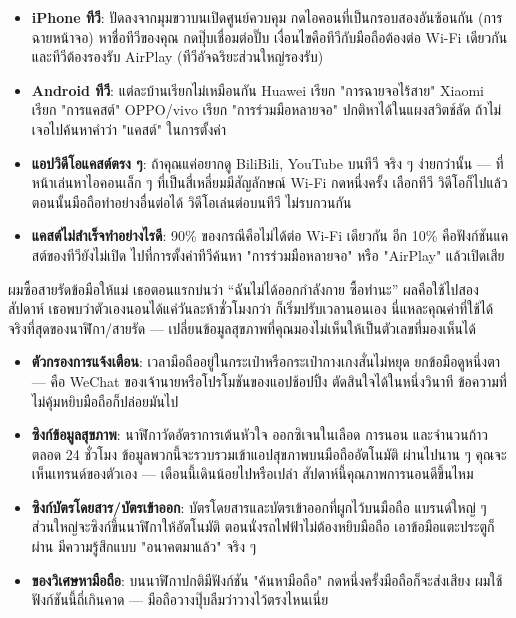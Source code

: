 \begin{itemize}
  \item \textbf{iPhone ทีวี}: ปัดลงจากมุมขวาบนเปิดศูนย์ควบคุม กดไอคอนที่เป็นกรอบสองอันซ้อนกัน (การฉายหน้าจอ) หาชื่อทีวีของคุณ กดปุ๊บเชื่อมต่อปั๊บ เงื่อนไขคือทีวีกับมือถือต้องต่อ Wi-Fi เดียวกัน และทีวีต้องรองรับ AirPlay (ทีวีอัจฉริยะส่วนใหญ่รองรับ)
  \item \textbf{Android ทีวี}: แต่ละบ้านเรียกไม่เหมือนกัน Huawei เรียก "การฉายจอไร้สาย" Xiaomi เรียก "การแคสต์" OPPO/vivo เรียก "การร่วมมือหลายจอ" ปกติหาได้ในแผงสวิตช์ลัด ถ้าไม่เจอไปค้นหาคำว่า "แคสต์" ในการตั้งค่า
  \item \textbf{แอปวิดีโอแคสต์ตรง ๆ}: ถ้าคุณแค่อยากดู BiliBili, YouTube บนทีวี จริง ๆ ง่ายกว่านั้น — ที่หน้าเล่นหาไอคอนเล็ก ๆ ที่เป็นสี่เหลี่ยมมีสัญลักษณ์ Wi-Fi กดหนึ่งครั้ง เลือกทีวี วิดีโอก็ไปแล้ว ตอนนั้นมือถือทำอย่างอื่นต่อได้ วิดีโอเล่นต่อบนทีวี ไม่รบกวนกัน
  \item \textbf{แคสต์ไม่สำเร็จทำอย่างไรดี}: 90\% ของกรณีคือไม่ได้ต่อ Wi-Fi เดียวกัน อีก 10\% คือฟังก์ชันแคสต์ของทีวียังไม่เปิด ไปที่การตั้งค่าทีวีค้นหา "การร่วมมือหลายจอ" หรือ "AirPlay" แล้วเปิดเสีย
\end{itemize}


ผมซื้อสายรัดข้อมือให้แม่ เธอตอนแรกบ่นว่า “ฉันไม่ได้ออกกำลังกาย ซื้อทำนะ” ผลคือใช้ไปสองสัปดาห์ เธอพบว่าตัวเองนอนได้แค่วันละห้าชั่วโมงกว่า ก็เริ่มปรับเวลานอนเอง นี่แหละคุณค่าที่ใช้ได้จริงที่สุดของนาฬิกา/สายรัด — เปลี่ยนข้อมูลสุขภาพที่คุณมองไม่เห็นให้เป็นตัวเลขที่มองเห็นได้

\begin{itemize}
  \item \textbf{ตัวกรองการแจ้งเตือน}: เวลามือถืออยู่ในกระเป๋าหรือกระเป๋ากางเกงสั่นไม่หยุด ยกข้อมือดูหนึ่งตา — คือ WeChat ของเจ้านายหรือโปรโมชันของแอปช้อปปิ้ง ตัดสินใจได้ในหนึ่งวินาที ข้อความที่ไม่คุ้มหยิบมือถือก็ปล่อยมันไป
  \item \textbf{ซิงก์ข้อมูลสุขภาพ}: นาฬิกาวัดอัตราการเต้นหัวใจ ออกซิเจนในเลือด การนอน และจำนวนก้าวตลอด 24 ชั่วโมง ข้อมูลพวกนี้จะรวบรวมเข้าแอปสุขภาพบนมือถืออัตโนมัติ ผ่านไปนาน ๆ คุณจะเห็นเทรนด์ของตัวเอง — เดือนนี้เดินน้อยไปหรือเปล่า สัปดาห์นี้คุณภาพการนอนดีขึ้นไหม
  \item \textbf{ซิงก์บัตรโดยสาร/บัตรเข้าออก}: บัตรโดยสารและบัตรเข้าออกที่ผูกไว้บนมือถือ แบรนด์ใหญ่ ๆ ส่วนใหญ่จะซิงก์ขึ้นนาฬิกาให้อัตโนมัติ ตอนนั่งรถไฟฟ้าไม่ต้องหยิบมือถือ เอาข้อมือแตะประตูก็ผ่าน มีความรู้สึกแบบ "อนาคตมาแล้ว" จริง ๆ
  \item \textbf{ของวิเศษหามือถือ}: บนนาฬิกาปกติมีฟังก์ชัน "ค้นหามือถือ" กดหนึ่งครั้งมือถือก็จะส่งเสียง ผมใช้ฟังก์ชันนี้ถี่เกินคาด — มือถือวางปุ๊บลืมว่าวางไว้ตรงไหนเนี่ย
\end{itemize}

